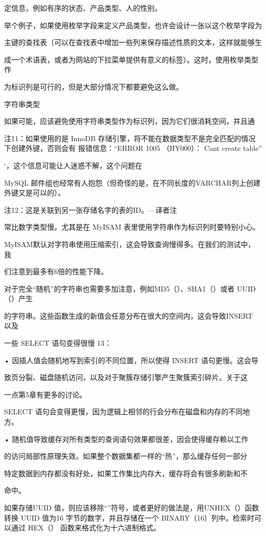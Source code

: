 定信息，例如有序的状态、产品类型、人的性别。

举个例子，如果使用枚举字段来定义产品类型，也许会设计一张以这个枚举字段为

主键的查找表（可以在查找表中增加一些列来保存描述性质的文本，这样就能够生

成一个术语表，或者为网站的下拉菜单提供有意义的标签）。这时，使用枚举类型作

为标识列是可行的，但是大部分情况下都要避免这么做。

字符串类型

如果可能，应该避免使用字符串类型作为标识列，因为它们很消耗空间，并且通

注11：如果使用的是 InnoDB 存储引擎，将不能在数据类型不是完全匹配的情况下创建外键，否则会有
报错信息：“ERROR 1005 （HY000）： Cant create table”

‘，这个信息可能让人迷惑不解，这个问题在

MySQL 邮件组也经常有人抱怨（但奇怪的是，在不同长度的VARCHAR列上创建外键又是可以的）。

注12：这是关联到另一张存储名字的表的ID。—译者注

常比数字类型慢。尤其是在 MyISAM 表里使用字符串作为标识列时要特别小心。

MyISAM默认对字符串使用压缩索引，这会导致查询慢得多。在我们的测试中，我

们注意到最多有6倍的性能下降。

对于完全“随机”的字符串也需要多加注意，例如MD5（）、SHA1（）或者 UUID（）产生

的字符串。这些函数生成的新值会任意分布在很大的空间内，这会导致INSERT 以及

一些 SELECT 语句变得很慢 13：

• 因插人值会随机地写到索引的不同位置，所以使得 INSERT 语句更慢。这会导

致页分裂、磁盘随机访问，以及对于聚簇存储引擎产生聚簇索引碎片。关于这

一点第5章有更多的讨论。

SELECT 语句会变得更慢，因为逻辑上相邻的行会分布在磁盘和内存的不同地方。

• 随机值导致缓存对所有类型的查询语句效果都很差，因会使得缓存赖以工作

的访问局部性原理失效。如果整个数据集都一样的“热”，那么缓存任何一部分

特定数据到内存都没有好处，如果工作集比内存大，缓存将会有很多刷新和不

命中。

如果存储UUID 值，则应该移除“”符号，或者更好的做法是，用UNHEX（）函数转换
UUID 值为16 字节的数字，并且存储在一个 BINARY（16）列中。检索时可以通过 HEX（）
函数来格式化为十六进制格式。

